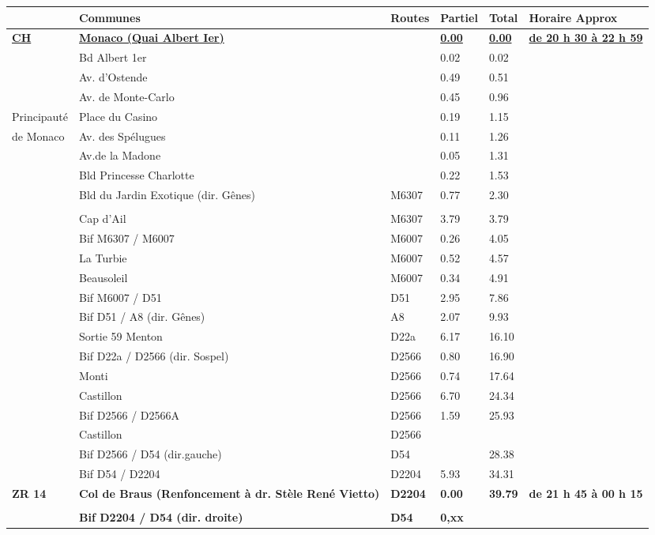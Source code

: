 \documentclass{article}%
\begin{document}
\begin{longtable}{p{2.25cm}|p{6.7cm}|p{2.0cm}|p{1.5cm}|p{1.5cm}|p{3.5cm}}%
\hline%
&Communes&Routes&Partiel&Total&Horaire Approx\\%
\hline%
\endhead%
\endfoot%
\endlastfoot%
\textbf{\underline{﻿CH}}&\textbf{\underline{Monaco  (Quai Albert Ier)}}& &\textbf{\underline{0.00}}&\textbf{\underline{0.00}}&\textbf{\underline{de 20 h 30 à 22 h 59}}\\%
 &Bd Albert 1er& &0.02&0.02& \\%
 &Av. d'Ostende& &0.49&0.51& \\%
 &Av. de Monte-Carlo& &0.45&0.96& \\%
Principauté&Place du Casino& &0.19&1.15& \\%
de Monaco&Av. des Spélugues& &0.11&1.26& \\%
 &Av.de la Madone& &0.05&1.31& \\%
 &Bld Princesse Charlotte& &0.22&1.53& \\%
 &Bld du Jardin Exotique (dir. Gênes)&M6307&0.77&2.30& \\%
\hline& & & & & \\%
 &Cap d'Ail &M6307&3.79&3.79& \\%
 &Bif M6307 / M6007&M6007&0.26&4.05& \\%
 &La Turbie&M6007&0.52&4.57& \\%
 &Beausoleil&M6007&0.34&4.91& \\%
 &Bif M6007 / D51&D51&2.95&7.86& \\%
 &Bif D51 / A8 (dir. Gênes)&A8&2.07&9.93& \\%
 &Sortie 59 Menton &D22a&6.17&16.10& \\%
 &Bif D22a / D2566  (dir. Sospel)&D2566&0.80&16.90& \\%
 &Monti&D2566&0.74&17.64& \\%
 &Castillon&D2566&6.70&24.34& \\%
 &Bif D2566 / D2566A&D2566&1.59&25.93& \\%
 &Castillon&D2566& & & \\%
 &Bif D2566 / D54 (dir.gauche)&D54& &28.38& \\%
 &Bif D54 / D2204&D2204&5.93&34.31& \\%
\textbf{ZR 14    }&\textbf{Col de Braus (Renfoncement à dr. Stèle René Vietto)   }&\textbf{D2204}&\textbf{0.00}&\textbf{39.79}&\textbf{de 21 h 45 à 00 h 15}\\%
 & & & & & \\%
 &\textbf{Bif D2204 / D54 (dir. droite)}&\textbf{D54}&\textbf{0,xx}& & \\%

\end{longtable}
\end{document}
